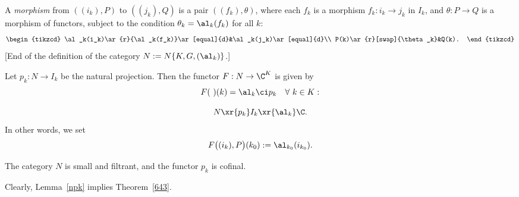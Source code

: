 \documentclass[12pt]{article}
\theoremstyle{remark}
\theoremstyle{definition}
\begin{document}
A \emph{morphism} from $((i_k),P)$ to $((j_k),Q)$ is a pair $((f_k),\theta)$, where each $f_k$ is a morphism $f_k:i_k\to j_k$ in $I_k$, and $\theta:P\to Q$ is a morphism of functors, subject to the condition $\theta_k=\al_k(f_k)$ for all $k$: 
$$ 
\begin{tikzcd} 
\al_k(i_k)\ar{r}{\al_k(f_k)}\ar[equal]{d}&\al_k(j_k)\ar[equal]{d}\\ 
P(k)\ar{r}[swap]{\theta_k}&Q(k).
\end{tikzcd} 
$$ 
[End of the definition of the category $N:=N\{K,G,(\al_k)\}$.] 

Let $p_k:N\to I_k$ be the natural projection. Then the functor %
$F:N\to\C^K$ is given by 
$$
F(\ )(k)=\al_k\ci p_k\quad\forall\ k\in K:
$$ 

$$
N\xr{p_k}I_k\xr{\al_k}\C.
$$ 
In other words, we set
$$
F\big((i_k),P\big)(k_0):=\al_{k_0}(i_{k_0}).
$$ 

\begin{lem}
The category $N$ is small and filtrant, and the functor $p_k$ is cofinal.
\end{lem} 

Clearly, Lemma~\ref{npk} implies Theorem~\ref{643}.  
\end{document}
